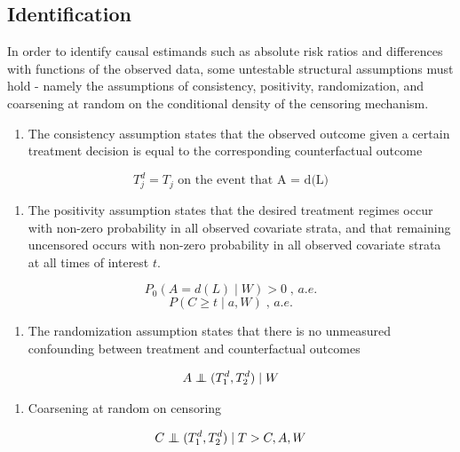 \documentclass{report}
\newcommand{\1}{\ensuremath{\mathbf{1}}}
\newcommand{\indep}{\ensuremath{\perp\hspace*{-1.4ex}\perp}}
\renewcommand{\L}{\ensuremath{W}}
\begin{document}
\subsection{Identification}
\label{identification}
In order to identify causal estimands such as absolute risk ratios and differences with functions of the observed data, some untestable structural assumptions must hold - namely the assumptions of consistency, positivity, randomization, and coarsening at random on the conditional density of the censoring mechanism. 


\begin{enumerate}
\item The consistency assumption states that the observed outcome given a certain treatment decision is equal to the corresponding counterfactual outcome
\end{enumerate}
\[ T^d_j = T_j \text{ on the event that A = d(L)} \]

\begin{enumerate}
\item The positivity assumption states that the desired treatment regimes occur with non-zero probability in all observed covariate strata, and that remaining uncensored occurs with non-zero probability in all observed covariate strata at all times of interest \(t\).
\end{enumerate}
\[ P_0\left( A = d(L) \mid \L \right) > 0 \;,\, a.e. \]
\[ P(C \geq t \mid a, \L) \;,\, a.e. \]

\begin{enumerate}
\item The randomization assumption states that there is no unmeasured confounding between treatment and counterfactual outcomes
\end{enumerate}
\[ A \indep (T^d_1, T^d_2) \mid \L \]

\begin{enumerate}
\item Coarsening at random on censoring
\end{enumerate}
\[ C \indep (T^d_1, T^d_2) \mid T > C, A, \L \]
\end{document}

